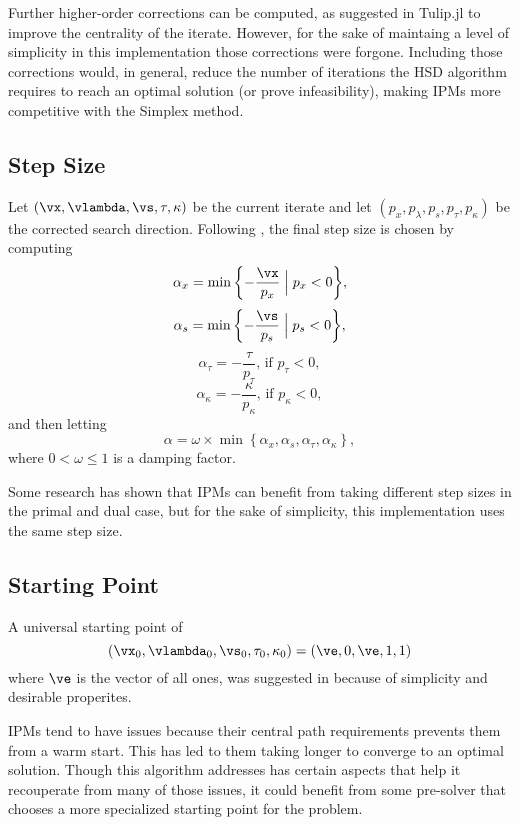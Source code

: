 \documentclass[titlepage]{abhi-tufte-handout}
\begin{document}
Further higher-order corrections can be computed, as suggested in Tulip.jl to
improve the centrality of the iterate. However, for the sake of maintaing a
level of simplicity in this implementation those corrections were forgone.
Including those corrections would, in general, reduce the number of iterations
the HSD algorithm requires to reach an optimal solution
(or prove infeasibility), making IPMs more competitive with the Simplex method.

\subsection{Step Size}\label{sec:step-size}
Let \((\vx, \vlambda, \vs, \tau, \kappa)\) be the current
iterate and let \({(p_x, p_{\lambda}, p_s, p_{\tau}, p_{\kappa})}\) be
the corrected search direction.
Following \citet{XuHungYe1996}, the final step size is chosen by computing
\[ \alpha_x = \min{\left\{ -\frac{\vx}{p_x} \mathrel{\Big|} p_x < 0\right\}}, \]
\[ \alpha_s = \min{\left\{ -\frac{\vs}{p_s} \mathrel{\Big|} p_s < 0\right\}}, \]
\[ \alpha_{\tau} = -\frac{\tau}{p_{\tau}}\text{, if } p_{\tau} < 0, \]
\[ \alpha_{\kappa} = -\frac{\kappa}{p_{\kappa}}\text{, if } p_{\kappa} < 0, \]
and then letting
\[ \alpha = \omega \times \min{\left\{ \alpha_x, \alpha_s, \alpha_{\tau},
   \alpha_{\kappa}\right\}}, \]
where \(0 < \omega \leq 1\) is a damping factor.

Some research has shown that IPMs can benefit from taking different step sizes
in the primal and dual case, but for the sake of simplicity, this
implementation uses the same step size.

\subsection{Starting Point}\label{sec:starting}
A universal starting point of
\[ (\vx_0, \vlambda_0, \vs_0, \tau_0, \kappa_0) = (\ve, 0, \ve, 1, 1)\]
where \(\ve\) is the vector of all ones, was suggested in
\citet{XuHungYe1996} because of simplicity and desirable properites.

IPMs tend to have issues because their central path requirements prevents them
from a warm start. This has led to them taking longer to converge to an optimal
solution. Though this algorithm addresses has certain aspects that help it
recouperate from many of those issues, it could benefit from some pre-solver
that chooses a more specialized starting point for the problem.
\end{document}
